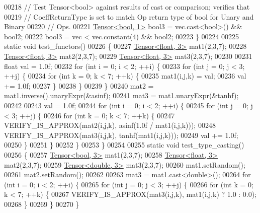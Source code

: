 \begin{DoxyCode}
00218   \textcolor{comment}{// Test Tensor<bool> against results of cast or comparison; verifies that}
00219   \textcolor{comment}{// CoeffReturnType is set to match Op return type of bool for Unary and Binary}
00220   \textcolor{comment}{// Ops.}
00221   \hyperlink{class_eigen_1_1_tensor}{Tensor<bool, 1>} bool3 = vec.cast<\textcolor{keywordtype}{bool}>() && bool2;
00222   bool3 = vec < vec.constant(4) && bool2;
00223 \}
00224 
00225 \textcolor{keyword}{static} \textcolor{keywordtype}{void} test\_functors()
00226 \{
00227   \hyperlink{class_eigen_1_1_tensor}{Tensor<float, 3>} mat1(2,3,7);
00228   \hyperlink{class_eigen_1_1_tensor}{Tensor<float, 3>} mat2(2,3,7);
00229   \hyperlink{class_eigen_1_1_tensor}{Tensor<float, 3>} mat3(2,3,7);
00230 
00231   \textcolor{keywordtype}{float} val = 1.0f;
00232   \textcolor{keywordflow}{for} (\textcolor{keywordtype}{int} i = 0; i < 2; ++i) \{
00233     \textcolor{keywordflow}{for} (\textcolor{keywordtype}{int} j = 0; j < 3; ++j) \{
00234       \textcolor{keywordflow}{for} (\textcolor{keywordtype}{int} k = 0; k < 7; ++k) \{
00235         mat1(i,j,k) = val;
00236         val += 1.0f;
00237       \}
00238     \}
00239   \}
00240   mat2 = mat1.inverse().unaryExpr(&asinf);
00241   mat3 = mat1.unaryExpr(&tanhf);
00242 
00243   val = 1.0f;
00244   \textcolor{keywordflow}{for} (\textcolor{keywordtype}{int} i = 0; i < 2; ++i) \{
00245     \textcolor{keywordflow}{for} (\textcolor{keywordtype}{int} j = 0; j < 3; ++j) \{
00246       \textcolor{keywordflow}{for} (\textcolor{keywordtype}{int} k = 0; k < 7; ++k) \{
00247         VERIFY\_IS\_APPROX(mat2(i,j,k), asinf(1.0f / mat1(i,j,k)));
00248         VERIFY\_IS\_APPROX(mat3(i,j,k), tanhf(mat1(i,j,k)));
00249         val += 1.0f;
00250       \}
00251     \}
00252   \}
00253 \}
00254 
00255 \textcolor{keyword}{static} \textcolor{keywordtype}{void} test\_type\_casting()
00256 \{
00257   \hyperlink{class_eigen_1_1_tensor}{Tensor<bool, 3>} mat1(2,3,7);
00258   \hyperlink{class_eigen_1_1_tensor}{Tensor<float, 3>} mat2(2,3,7);
00259   \hyperlink{class_eigen_1_1_tensor}{Tensor<double, 3>} mat3(2,3,7);
00260   mat1.setRandom();
00261   mat2.setRandom();
00262 
00263   mat3 = mat1.cast<\textcolor{keywordtype}{double}>();
00264   \textcolor{keywordflow}{for} (\textcolor{keywordtype}{int} i = 0; i < 2; ++i) \{
00265     \textcolor{keywordflow}{for} (\textcolor{keywordtype}{int} j = 0; j < 3; ++j) \{
00266       \textcolor{keywordflow}{for} (\textcolor{keywordtype}{int} k = 0; k < 7; ++k) \{
00267         VERIFY\_IS\_APPROX(mat3(i,j,k), mat1(i,j,k) ? 1.0 : 0.0);
00268       \}
00269     \}
00270   \}

\end{DoxyCode}
